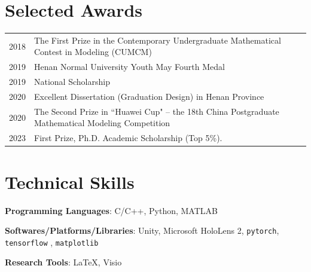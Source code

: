 \documentclass[a4paper,12pt]{article}
\begin{document}
\section{Selected Awards}
\begin{tabularx}{\linewidth}{@{}l X@{}}
2018  &  \normalsize{The First Prize in the Contemporary Undergraduate Mathematical Contest in Modeling (CUMCM)}\\
2019  &  \normalsize{Henan Normal University Youth May Fourth Medal}\\
2019  &  \normalsize{National Scholarship}\\  
2020  &  \normalsize{Excellent Dissertation (Graduation Design) in Henan Province}\\  
2020  &  \normalsize{The Second Prize in ``Huawei Cup" -- the 18th China Postgraduate Mathematical Modeling Competition}\\  
2023 & First Prize, Ph.D. Academic Scholarship (Top 5\%). \\
\end{tabularx}

\section{Technical Skills}
{\bf Programming Languages}: C/C++, Python, MATLAB

{\bf Softwares/Platforms/Libraries}: Unity, Microsoft HoloLens 2, \verb|pytorch|, \verb|tensorflow|
, \verb|matplotlib|

{\bf Research Tools}: \LaTeX, Visio

\vfill
{}
\end{document}
